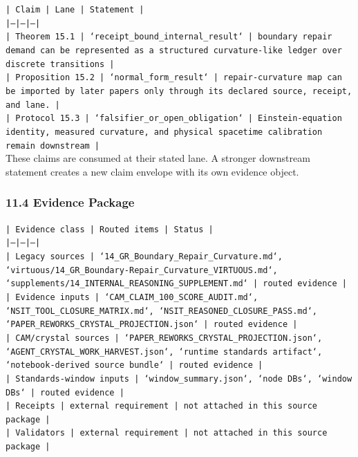 \documentclass[11pt]{article}
\begin{document}
\noindent\texttt{| Claim | Lane | Statement |}\\
\noindent\texttt{|---|---|---|}\\
\noindent\texttt{| Theorem 15.1 | `receipt\_bound\_internal\_result` | boundary repair demand can be represented as a structured curvature-like ledger over discrete transitions |}\\
\noindent\texttt{| Proposition 15.2 | `normal\_form\_result` | repair-curvature map can be imported by later papers only through its declared source, receipt, and lane. |}\\
\noindent\texttt{| Protocol 15.3 | `falsifier\_or\_open\_obligation` | Einstein-equation identity, measured curvature, and physical spacetime calibration remain downstream |}\\

These claims are consumed at their stated lane. A stronger downstream statement
creates a new claim envelope with its own evidence object.

\subsubsection*{11.4 Evidence Package}

\noindent\texttt{| Evidence class | Routed items | Status |}\\
\noindent\texttt{|---|---|---|}\\
\noindent\texttt{| Legacy sources | `14\_GR\_Boundary\_Repair\_Curvature.md`, `virtuous/14\_GR\_Boundary-Repair\_Curvature\_VIRTUOUS.md`, `supplements/14\_INTERNAL\_REASONING\_SUPPLEMENT.md` | routed evidence |}\\
\noindent\texttt{| Evidence inputs | `CAM\_CLAIM\_100\_SCORE\_AUDIT.md`, `NSIT\_TOOL\_CLOSURE\_MATRIX.md`, `NSIT\_REASONED\_CLOSURE\_PASS.md`, `PAPER\_REWORKS\_CRYSTAL\_PROJECTION.json` | routed evidence |}\\
\noindent\texttt{| CAM/crystal sources | `PAPER\_REWORKS\_CRYSTAL\_PROJECTION.json`, `AGENT\_CRYSTAL\_WORK\_HARVEST.json`, `runtime standards artifact`, `notebook-derived source bundle` | routed evidence |}\\
\noindent\texttt{| Standards-window inputs | `window\_summary.json`, `node DBs`, `window DBs` | routed evidence |}\\
\noindent\texttt{| Receipts | external requirement | not attached in this source package |}\\
\noindent\texttt{| Validators | external requirement | not attached in this source package |}\\
\end{document}

